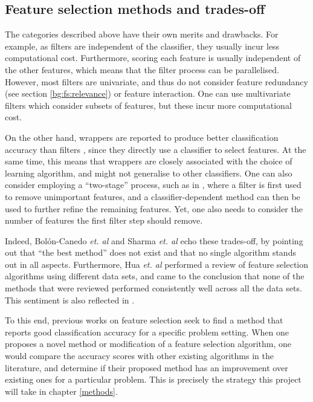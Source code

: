 \documentclass[12pt, twoside, a4paper]{report}
\begin{document}
\subsection{Feature selection methods and trades-off} \label{bg:fs:tradeoff}

The categories described above have their own merits and drawbacks. For example, as filters are independent of the classifier, they usually incur less computational cost. Furthermore, scoring each feature is usually independent of the other features, which means that the filter process can be parallelised. However, most filters are univariate, and thus do not consider feature redundancy (see section \ref{bg:fs:relevance}) or feature interaction. One can use multivariate filters which consider subsets of features, but these incur more computational cost.

On the other hand, wrappers are reported to produce better classification accuracy than filters \cite{RefWorks:163}, since they directly use a classifier to select features. At the same time, this means that wrappers are closely associated with the choice of learning algorithm, and might not generalise to other classifiers. One can also consider employing a ``two-stage'' process, such as in \cite{RefWorks:216}, where a filter is first used to remove unimportant features, and a classifier-dependent method can then be used to further refine the remaining features. Yet, one also needs to consider the number of features the first filter step should remove.

Indeed, Bolón-Canedo \textit{et. al} \cite{RefWorks:163} and Sharma \textit{et. al} \cite{RefWorks:215} echo these trades-off, by pointing out that ``the best method'' does not exist and that no single algorithm stands out in all aspects. Furthermore, Hua \textit{et. al} \cite{RefWorks:216} performed a review of feature selection algorithms using different data sets, and came to the conclusion that none of the methods that were reviewed performed consistently well across all the data sets. This sentiment is also reflected in \cite{RefWorks:217}.

To this end, previous works on feature selection seek to find a method that reports good classification accuracy for a specific problem setting. When one proposes a novel method or modification of a feature selection algorithm, one would compare the accuracy scores with other existing algorithms in the literature, and determine if their proposed method has an improvement over existing ones for a particular problem. This is precisely the strategy this project will take in chapter \ref{methods}.
\end{document}

